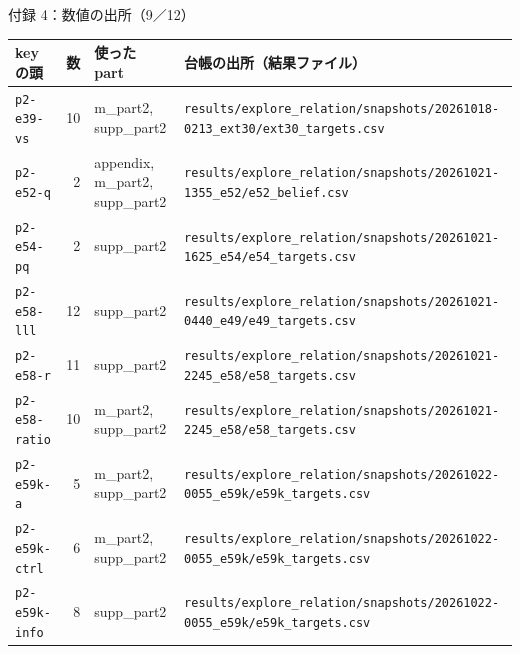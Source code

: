 \begin{frame}{付録 4：数値の出所（9／12）}
  \vspace{-0.3em}\centering\tiny\renewcommand{\arraystretch}{1.0}
  \begin{tabularx}{\textwidth}{@{}l r l X@{}}
    \toprule key の頭 & 数 & 使った part & 台帳の出所（結果ファイル） \\ \midrule
    \texttt{p2-e39-vs} & 10 & m\_part2, supp\_part2 & \texttt{results/\allowbreak{}explore\_\allowbreak{}relation/\allowbreak{}snapshots/\allowbreak{}20261018-0213\_\allowbreak{}ext30/\allowbreak{}ext30\_\allowbreak{}targets.csv} \\
    \texttt{p2-e52-q} & 2 & appendix, m\_part2, supp\_part2 & \texttt{results/\allowbreak{}explore\_\allowbreak{}relation/\allowbreak{}snapshots/\allowbreak{}20261021-1355\_\allowbreak{}e52/\allowbreak{}e52\_\allowbreak{}belief.csv} \\
    \texttt{p2-e54-pq} & 2 & supp\_part2 & \texttt{results/\allowbreak{}explore\_\allowbreak{}relation/\allowbreak{}snapshots/\allowbreak{}20261021-1625\_\allowbreak{}e54/\allowbreak{}e54\_\allowbreak{}targets.csv} \\
    \texttt{p2-e58-lll} & 12 & supp\_part2 & \texttt{results/\allowbreak{}explore\_\allowbreak{}relation/\allowbreak{}snapshots/\allowbreak{}20261021-0440\_\allowbreak{}e49/\allowbreak{}e49\_\allowbreak{}targets.csv} \\
    \texttt{p2-e58-r} & 11 & supp\_part2 & \texttt{results/\allowbreak{}explore\_\allowbreak{}relation/\allowbreak{}snapshots/\allowbreak{}20261021-2245\_\allowbreak{}e58/\allowbreak{}e58\_\allowbreak{}targets.csv} \\
    \texttt{p2-e58-ratio} & 10 & m\_part2, supp\_part2 & \texttt{results/\allowbreak{}explore\_\allowbreak{}relation/\allowbreak{}snapshots/\allowbreak{}20261021-2245\_\allowbreak{}e58/\allowbreak{}e58\_\allowbreak{}targets.csv} \\
    \texttt{p2-e59k-a} & 5 & m\_part2, supp\_part2 & \texttt{results/\allowbreak{}explore\_\allowbreak{}relation/\allowbreak{}snapshots/\allowbreak{}20261022-0055\_\allowbreak{}e59k/\allowbreak{}e59k\_\allowbreak{}targets.csv} \\
    \texttt{p2-e59k-ctrl} & 6 & m\_part2, supp\_part2 & \texttt{results/\allowbreak{}explore\_\allowbreak{}relation/\allowbreak{}snapshots/\allowbreak{}20261022-0055\_\allowbreak{}e59k/\allowbreak{}e59k\_\allowbreak{}targets.csv} \\
    \texttt{p2-e59k-info} & 8 & supp\_part2 & \texttt{results/\allowbreak{}explore\_\allowbreak{}relation/\allowbreak{}snapshots/\allowbreak{}20261022-0055\_\allowbreak{}e59k/\allowbreak{}e59k\_\allowbreak{}targets.csv} \\

\end{tabularx}
\end{frame}
